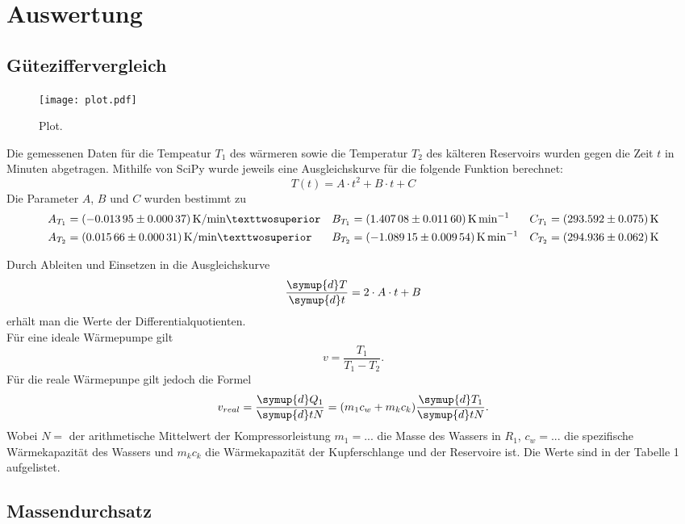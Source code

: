 \section{Auswertung}
\label{sec:Auswertung}

\subsection{Güteziffervergleich}
\begin{figure}
  \centering
  \texttt{[image: plot.pdf]}
  \caption{Plot.}
  \label{fig:plot}
\end{figure}
Die gemessenen Daten für die Tempeatur $T_1$ des wärmeren sowie die Temperatur
$T_2$ des kälteren Reservoirs wurden gegen die Zeit $t$ in Minuten abgetragen.
Mithilfe von SciPy wurde jeweils eine Ausgleichskurve für die folgende Funktion
berechnet:
\begin{equation}
  T(t)=A \cdot t^2 + B \cdot t + C
\end{equation}
Die Parameter $A$, $B$ und $C$ wurden bestimmt zu
\begin{align}
  A_{T_1} &= \SI{-0,01395 +- 0.00037}{\kelvin\per\minute²} & B_{T_1} &= \SI{1,40708 +- 0.01160}{\kelvin\per\minute} & C_{T_1} &= \SI{293,592 +- 0.075}{\kelvin} \\
  A_{T_2} &= \SI{0,01566 +- 0.00031}{\kelvin\per\minute²}  & B_{T_2} &= \SI{-1,08915 +- 0.00954}{\kelvin\per\minute} & C_{T_2} &= \SI{294,936 +- 0.062}{\kelvin}
\end{align}

Durch Ableiten und Einsetzen in die Ausgleichskurve
\begin{equation}
  \frac{\symup{d}T}{\symup{d}t}= 2 \cdot A \cdot t + B
\end{equation}
erhält man die Werte der Differentialquotienten. \\
Für eine ideale Wärmepumpe gilt
\begin{equation}
  v = \frac{T_1}{T_1-T_2}.
\end{equation}
Für die reale Wärmepunpe gilt jedoch die Formel
\begin{equation}
  v_{real}= \frac{\symup{d} Q_1}{\symup{d} tN} = (m_1c_w+m_kc_k)\frac{\symup{d} T_1}{\symup{d} tN}.
\end{equation}
Wobei $ N = $ der arithmetische Mittelwert der Kompressorleistung $ m_1 = ...$ die Masse des Wassers in $ R_1 $, $ c_w = ...$ die spezifische Wärmekapazität des Wassers und $ m_kc_k $ die Wärmekapazität der Kupferschlange und der Reservoire ist.
Die Werte sind in der Tabelle 1 aufgelistet.
\begin{equation}
\end{equation}

\subsection{Massendurchsatz}
